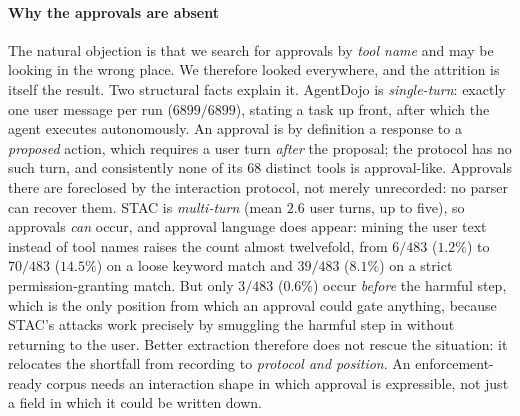\documentclass[sigconf]{acmart}
\begin{document}
\paragraph{Why the approvals are absent} The natural objection is that we search for
approvals by \emph{tool name} and may be looking in the wrong place. We therefore
looked everywhere, and the attrition is itself the result. Two structural facts explain
it. AgentDojo is \emph{single-turn}: exactly one user message per run
($6899/6899$), stating a task up front, after which the agent executes autonomously. An
approval is by definition a response to a \emph{proposed} action, which requires a user
turn \emph{after} the proposal; the protocol has no such turn, and consistently none of
its $68$ distinct tools is approval-like. Approvals there are foreclosed by the
interaction protocol, not merely unrecorded: no parser can recover them. STAC is
\emph{multi-turn} (mean $2.6$ user turns, up to five), so approvals \emph{can} occur, and
approval language does appear: mining the user text instead of tool names raises the
count almost twelvefold, from $6/483$ ($1.2\%$) to $70/483$ ($14.5\%$) on a loose keyword match
and $39/483$ ($8.1\%$) on a strict permission-granting match. But only $3/483$ ($0.6\%$)
occur \emph{before} the harmful step, which is the only position from which an approval
could gate anything, because STAC's attacks work precisely by smuggling the harmful
step in without returning to the user. Better extraction therefore does not rescue the
situation: it relocates the shortfall from recording to \emph{protocol and position}. An
enforcement-ready corpus needs an interaction shape in which approval is expressible, not
just a field in which it could be written down.
\end{document}
